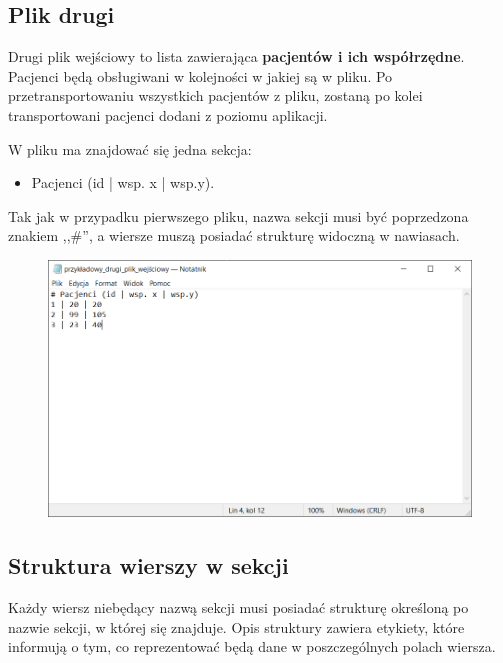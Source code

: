 \documentclass{article}
\begin{document}
{\clearpage

\subsection{Plik drugi}
Drugi plik wejściowy to lista zawierająca \textbf{pacjentów i ich współrzędne}.
Pacjenci będą obsługiwani w kolejności w jakiej są w pliku. Po przetransportowaniu wszystkich pacjentów z pliku, zostaną po kolei transportowani pacjenci dodani z poziomu aplikacji.

W pliku ma znajdować się jedna sekcja:
\begin{itemize}
    \item Pacjenci (id | wsp. x | wsp.y).
\end{itemize}


Tak jak w przypadku pierwszego pliku, nazwa sekcji musi być poprzedzona znakiem ,,\#'', a wiersze muszą posiadać strukturę widoczną w nawiasach.

 \begin{figure} [hbt!]
        \centering
        \includegraphics[width=15cm]{images/przykładowy_drugi_plik_wejściowyPNG.PNG}
    \end{figure}
    
\clearpage

\subsection{Struktura wierszy w sekcji}
Każdy wiersz niebędący nazwą sekcji musi posiadać strukturę określoną po nazwie sekcji, w której się znajduje. Opis struktury zawiera etykiety, które informują o tym, co reprezentować będą dane w poszczególnych polach wiersza. \\

}
\end{document}
